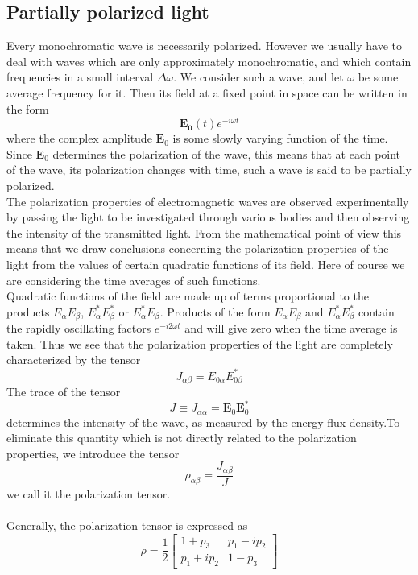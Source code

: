 \documentclass[cyan]{elegantnote}
\begin{document}
\subsection{Partially polarized light}
Every monochromatic wave is necessarily polarized. However we usually have to deal with waves which are only approximately monochromatic, and which contain frequencies in a small interval $\Delta \omega$. We consider such a wave, and let $\omega$ be some average frequency for it. Then its field at a fixed point in space can be written in the form
\[\bm{E_0}(t)e^{-i\omega t}\]
where the complex amplitude $\bm{E}_0$ is some slowly varying function of the time. Since $\bm{E}_0$ determines the polarization of the wave, this means that at each point of the wave, its polarization changes with time, such a wave is said to be partially polarized.\\
The polarization properties of electromagnetic waves are observed experimentally by passing the light to be investigated through various bodies and then
observing the intensity of the transmitted light. From the mathematical point of view this means that we draw conclusions concerning the polarization properties of the light from the values of certain quadratic functions of its field. Here of course we are considering the time averages of such functions.\\
Quadratic functions of the field are made up of terms proportional to the products $E_{\alpha} E_{\beta}$,
$E_{\alpha}^{*} E^{*}_{\beta}$ or $E_{\alpha}^* E_{\beta}$. Products of the form $E_{\alpha} E_{\beta}$ and
$E_{\alpha}^{*} E^{*}_{\beta}$ contain the rapidly oscillating factors $e^{-i2\omega t}$ and will give zero when the time average is taken. Thus we see that the polarization properties of the light are completely characterized by the tensor
\[J_{\alpha \beta} = E_{0\alpha} E_{0\beta}^{*}\]
The trace of the tensor
\[J \equiv J_{\alpha\alpha} = \bm{E}_0 \bm{E}^*_0\]
determines the intensity of the wave, as measured by the energy flux density.To eliminate this quantity which is not directly related to the polarization properties, we
introduce the tensor
\[\rho_{\alpha\beta} = \frac{J_{\alpha\beta}}{J}\]
we call it the polarization tensor.\\ \\
Generally, the polarization tensor is expressed as
\[\rho = \frac{1}{2} \left[ \begin{matrix} 1+p_{3}& p_1-ip_2\\ p_1+ip_2& 1-p_{3}\end{matrix} \right] \]
\end{document}
